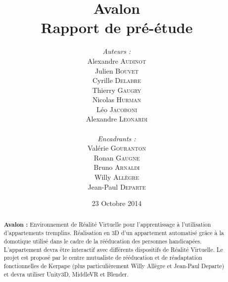 \documentclass[a4paper,11pt]{article}
\title{
  \textbf{Avalon}\\
  Rapport de pré-étude
}
\author{
\begin{minipage}{0.4\textwidth}
	\begin{flushleft} \large
		\emph{Auteurs :}\\
		Alexandre \textsc{Audinot}\\
		Julien \textsc{Bouvet}\\
		Cyrille \textsc{Delabre}\\
		Thierry \textsc{Gaugry}\\
		Nicolas \textsc{Hurman}\\
		Léo \textsc{Jacoboni}\\
		Alexandre \textsc{Leonardi}\\
	\end{flushleft}
\end{minipage}
\begin{minipage}{0.4\textwidth}
	\begin{flushright} \large
		\emph{Encadrants :} \\
		Valérie \textsc{Gouranton}\\
		Ronan \textsc{Gaugne}\\
		Bruno \textsc{Arnaldi}\\
		Willy \textsc{Allègre}\\
		Jean-Paul  \textsc{Departe}\\
	\end{flushright}
\end{minipage}
}
\date{23 Octobre 2014}
\begin{document}
\maketitle
\thispagestyle{empty}
\begin{abstract}
\textbf{Avalon :} Environnement de Réalité Virtuelle pour l'apprentissage à l'utilisation d'appartements tremplins. Réalisation en 3D d'un appartement automatisé grâce à la domotique utilisé dans le cadre de la rééducation des personnes handicapées. L'appartement devra être interactif avec différents dispositifs de Réalité Virtuelle. 
Le projet est proposé par le centre mutualiste de rééducation et de réadaptation fonctionnelles de Kerpape (plus particulièrement Willy Allègre et Jean-Paul Departe) et devra utiliser Unity3D, MiddleVR et Blender. 
\end{abstract}
\end{document}
